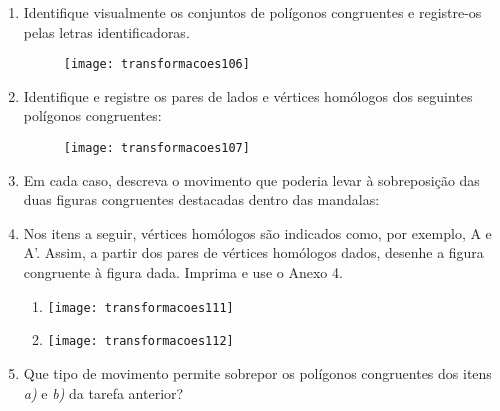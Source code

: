 \begin{enumerate}
\item Identifique visualmente os conjuntos de polígonos congruentes e registre-os pelas letras identificadoras. 
 
\begin{figure}[H]
\centering

\texttt{[image: transformacoes106]}
\end{figure}

\item Identifique e registre os pares de lados e vértices homólogos dos seguintes polígonos congruentes: 
 
\begin{figure}[H]
\centering

\texttt{[image: transformacoes107]}
\end{figure}

\item Em cada caso, descreva o movimento que poderia levar à sobreposição das duas figuras congruentes destacadas dentro das mandalas: 
\begin{enumerate}
\end{enumerate}
 

\item Nos itens a seguir, vértices homólogos são indicados como, por exemplo, A e A’. Assim, a partir dos pares de vértices homólogos dados, desenhe a figura congruente à figura dada. Imprima e use o Anexo 4.
\begin{enumerate}
\item {}
{
\texttt{[image: transformacoes111]}
}
 
\item {}
{
\texttt{[image: transformacoes112]}
}
\end{enumerate}
 

\item Que tipo de movimento permite sobrepor os polígonos congruentes dos itens \textit{a)} e \textit{b)} da tarefa anterior?


\end{enumerate}
